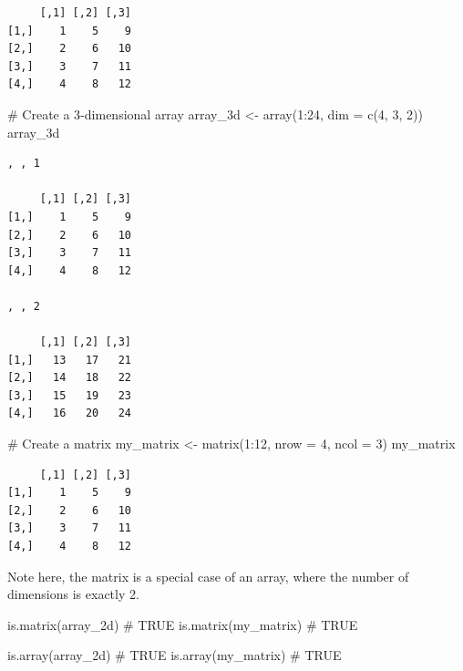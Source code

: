 \documentclass[
  letterpaper,
  DIV=11,
  numbers=noendperiod]{scrreprt}
\newenvironment{Shaded}{\begin{snugshade}}{\end{snugshade}}
\newcommand{\AttributeTok}[1]{\textcolor[rgb]{0.40,0.45,0.13}{#1}}
\newcommand{\CommentTok}[1]{\textcolor[rgb]{0.37,0.37,0.37}{#1}}
\newcommand{\DecValTok}[1]{\textcolor[rgb]{0.68,0.00,0.00}{#1}}
\newcommand{\FunctionTok}[1]{\textcolor[rgb]{0.28,0.35,0.67}{#1}}
\newcommand{\NormalTok}[1]{\textcolor[rgb]{0.00,0.23,0.31}{#1}}
\newcommand{\OtherTok}[1]{\textcolor[rgb]{0.00,0.23,0.31}{#1}}
\newcommand{\SpecialCharTok}[1]{\textcolor[rgb]{0.37,0.37,0.37}{#1}}
\begin{document}
\begin{verbatim}
     [,1] [,2] [,3]
[1,]    1    5    9
[2,]    2    6   10
[3,]    3    7   11
[4,]    4    8   12
\end{verbatim}

\begin{Shaded}
\begin{Highlighting}[]
\CommentTok{\# Create a 3{-}dimensional array}
\NormalTok{array\_3d }\OtherTok{\textless{}{-}} \FunctionTok{array}\NormalTok{(}\DecValTok{1}\SpecialCharTok{:}\DecValTok{24}\NormalTok{, }\AttributeTok{dim =} \FunctionTok{c}\NormalTok{(}\DecValTok{4}\NormalTok{, }\DecValTok{3}\NormalTok{, }\DecValTok{2}\NormalTok{))}
\NormalTok{array\_3d}
\end{Highlighting}
\end{Shaded}

\begin{verbatim}
, , 1

     [,1] [,2] [,3]
[1,]    1    5    9
[2,]    2    6   10
[3,]    3    7   11
[4,]    4    8   12

, , 2

     [,1] [,2] [,3]
[1,]   13   17   21
[2,]   14   18   22
[3,]   15   19   23
[4,]   16   20   24
\end{verbatim}

\begin{Shaded}
\begin{Highlighting}[]
\CommentTok{\# Create a matrix}
\NormalTok{my\_matrix }\OtherTok{\textless{}{-}} \FunctionTok{matrix}\NormalTok{(}\DecValTok{1}\SpecialCharTok{:}\DecValTok{12}\NormalTok{, }\AttributeTok{nrow =} \DecValTok{4}\NormalTok{, }\AttributeTok{ncol =} \DecValTok{3}\NormalTok{)}
\NormalTok{my\_matrix}
\end{Highlighting}
\end{Shaded}

\begin{verbatim}
     [,1] [,2] [,3]
[1,]    1    5    9
[2,]    2    6   10
[3,]    3    7   11
[4,]    4    8   12
\end{verbatim}

Note here, the matrix is a special case of an array, where the number of
dimensions is exactly 2.

\begin{Shaded}
\begin{Highlighting}[]
\FunctionTok{is.matrix}\NormalTok{(array\_2d)   }\CommentTok{\# TRUE}
\FunctionTok{is.matrix}\NormalTok{(my\_matrix)  }\CommentTok{\# TRUE}

\FunctionTok{is.array}\NormalTok{(array\_2d)    }\CommentTok{\# TRUE}
\FunctionTok{is.array}\NormalTok{(my\_matrix)   }\CommentTok{\# TRUE}
\end{Highlighting}
\end{Shaded}
\end{document}
